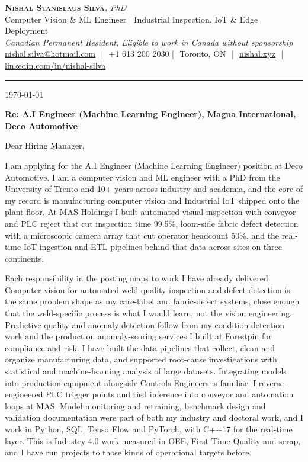 \documentclass[11pt]{article}
\makeatletter
\newcommand{\clName}{Nishal Stanislaus Silva}
\newcommand{\clEmail}{nishal.silva@hotmail.com}
\newcommand{\clPhone}{+1 613 200 2030}
\newcommand{\clCity}{Toronto, ON}
\newcommand{\clSite}{https://nishal.xyz}
\newcommand{\clLinkedIn}{https://www.linkedin.com/in/nishal-silva}
\newcommand{\clStatus}{Canadian Permanent Resident, Eligible to work in Canada without sponsorship}
\newcommand{\clTagline}{Computer Vision \& ML Engineer | Industrial Inspection, IoT \& Edge Deployment}
\newcommand{\clRole}{A.I Engineer (Machine Learning Engineer)}
\newcommand{\clCompany}{Magna International, Deco Automotive}
\newcommand{\clAddressee}{Dear Hiring Manager,}
\makeatother
\begin{document}
\pagestyle{empty}
\begin{center}
    {\LARGE \scshape \textbf{\clName}}{\large \textit{, PhD}}\\[1pt]
    {\small \clTagline}\\[1pt]
    {\footnotesize\textit{\clStatus}}\\[1pt]
    {\small
    \href{mailto:\clEmail}{\clEmail} \,\,|\,\, \clPhone \,\,|\,\, \clCity
    \,\,|\,\, \href{\clSite}{nishal.xyz} \,\,|\,\, \href{\clLinkedIn}{linkedin.com/in/nishal-silva}}
\end{center}

\rule{\linewidth}{0.4pt}\vspace{0.6em}

\today

\textbf{Re: \clRole{}, \clCompany{}}

\clAddressee

I am applying for the \clRole{} position at Deco Automotive. I am a computer vision and ML engineer with a PhD from the University of Trento and 10+ years across industry and academia, and the core of my record is manufacturing computer vision and Industrial IoT shipped onto the plant floor. At MAS Holdings I built automated visual inspection with conveyor and PLC reject that cut inspection time 99.5\%, loom-side fabric defect detection with a microscopic camera array that cut operator headcount 50\%, and the real-time IoT ingestion and ETL pipelines behind that data across sites on three continents.

Each responsibility in the posting maps to work I have already delivered. Computer vision for automated weld quality inspection and defect detection is the same problem shape as my care-label and fabric-defect systems, close enough that the weld-specific process is what I would learn, not the vision engineering. Predictive quality and anomaly detection follow from my condition-detection work and the production anomaly-scoring services I built at Forestpin for compliance and risk. I have built the data pipelines that collect, clean and organize manufacturing data, and supported root-cause investigations with statistical and machine-learning analysis of large datasets. Integrating models into production equipment alongside Controls Engineers is familiar: I reverse-engineered PLC trigger points and tied inference into conveyor and automation loops at MAS. Model monitoring and retraining, benchmark design and validation documentation were part of both my industry and doctoral work, and I work in Python, SQL, TensorFlow and PyTorch, with C++17 for the real-time layer. This is Industry 4.0 work measured in OEE, First Time Quality and scrap, and I have run projects to those kinds of operational targets before.
\end{document}
